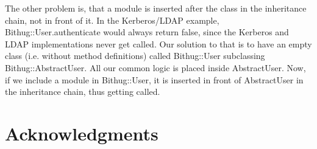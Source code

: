 \documentclass{llncs}
\begin{document}
The other problem is, that a module is inserted after the class in the inheritance chain, not in front of it. In the Kerberos/LDAP
example, Bithug::User.authenticate would always return false, since the Kerberos and LDAP implementations never get called. Our
solution to that is to have an empty class (i.e. without method definitions) called Bithug::User subclassing Bithug::AbstractUser.
All our common logic is placed inside AbstractUser. Now, if we include a module in Bithug::User, it is inserted in front of AbstractUser
in the inheritance chain, thus getting called.

\section*{Acknowledgments}


\clearpage
\end{document}

